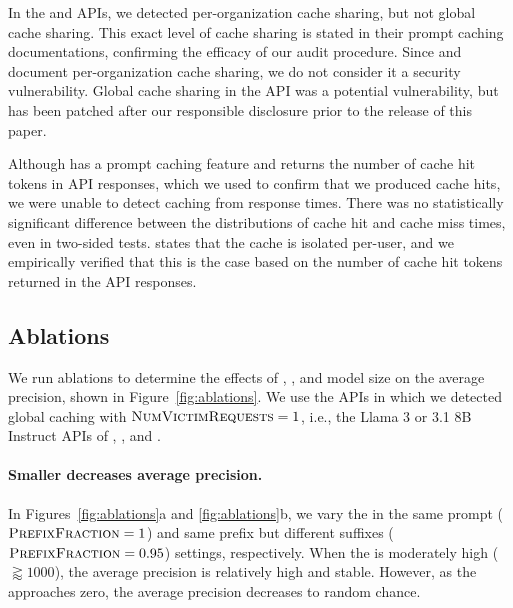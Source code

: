 In the \Anthropic{} \AnthropicModel{} and \OpenAI{} \OpenAIChatModel{} APIs, we detected per-organization cache sharing, but not global cache sharing. This exact level of cache sharing is stated in their prompt caching documentations, confirming the efficacy of our audit procedure. Since \citet{openai-caching-docs} and \citet{anthropic-caching-docs} document per-organization cache sharing, we do not consider it a security vulnerability. Global cache sharing in the \OpenAI{} \OpenAIEmbeddingModel{} API was a potential vulnerability, but has been patched after our responsible disclosure prior to the release of this paper.

Although \citet{deepseek-caching} has a prompt caching feature and returns the number of cache hit tokens in API responses, which we used to confirm that we produced cache hits, we were unable to detect caching from response times. There was no statistically significant difference between the distributions of cache hit and cache miss times, even in two-sided tests. \DeepSeek{} states that the cache is isolated per-user, and we empirically verified that this is the case based on the number of cache hit tokens returned in the API responses.





\subsection{Ablations}
\label{sec:ablations}


We run ablations to determine the effects of \PromptLength{}, \PrefixFraction{}, and model size on the average precision, shown in Figure~\ref{fig:ablations}. We use the APIs in which we detected global caching with $\textsc{NumVictimRequests}{} = 1$, i.e., the Llama 3 or 3.1 8B Instruct APIs of \Fireworks{}, \Perplexity{}, and \Replicate{}.


\paragraph{Smaller \PromptLength{} decreases average precision.} In Figures~\ref{fig:ablations}a and \ref{fig:ablations}b, we vary the \PromptLength{} in the same prompt ($\textsc{PrefixFraction} = 1$) and same prefix but different suffixes ($\textsc{PrefixFraction} = 0.95$) settings, respectively. When the \PromptLength{} is moderately high ($\gtrapprox 1000$), the average precision is relatively high and stable. However, as the \PromptLength{} approaches zero, the average precision decreases to random chance.

